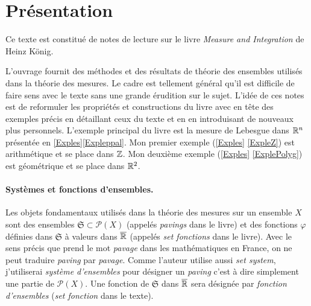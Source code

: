

\section{Présentation}
\noindent Ce texte est constitué de notes de lecture sur le livre \emph{Measure and Integration} de Heinz König.

\noindent L'ouvrage fournit des méthodes et des résultats de théorie des ensembles utilisés dans la théorie des mesures. Le cadre est tellement général qu'il est difficile de faire sens avec le texte sans une grande érudition sur le sujet. L'idée de ces notes est de reformuler les propriétés et constructions du livre avec en tête des exemples précis en détaillant ceux du texte et en en introduisant de nouveaux plus personnels.\newline
L'exemple principal du livre est la mesure de Lebesgue dans $\mathbb{R}^n$ présentée en \ref{Exples}\ref{Expleppal}. Mon premier exemple (\ref{Exples} \ref{ExpleZ}) est arithmétique et se place dans $\mathbb{Z}$. Mon deuxième exemple (\ref{Exples} \ref{ExplePolyg}) est géométrique et se place dans $\mathbb{R}^2$.

\paragraph*{Systèmes et fonctions d'ensembles.}
Les objets fondamentaux utilisés dans la théorie des mesures sur un ensemble $X$ sont des ensembles $\mathfrak{S} \subset \mathcal{P}(X)$ (appelés \emph{pavings} dans le livre) et des fonctions $\varphi$ définies dans $\mathfrak{S}$ à valeurs dans $\overline{\mathbb{R}}$ (appelés \emph{set fonctions} dans le livre).\newline
Avec le sens précis que prend le mot \emph{pavage} dans les mathématiques en France, on ne peut traduire \emph{paving} par \emph{pavage}. Comme l'auteur utilise aussi \emph{set system}, j'utiliserai \emph{système d'ensembles} pour désigner un \emph{paving} c'est à dire simplement une partie de $\mathcal{P}(X)$.\newline
Une fonction de $\mathfrak{S}$ dans $\overline{\mathbb{R}}$ sera désignée par \emph{fonction d'ensembles} (\emph{set fonction} dans le texte).\newline

